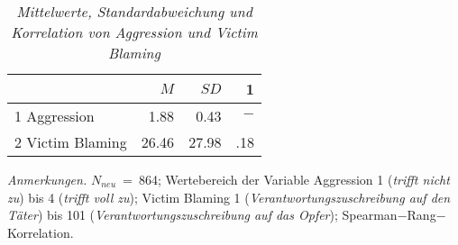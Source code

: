 \begin{table}[htb]
    \caption[Mittelwerte, Standardabweichung und Korrelation von Aggression und Victim Blaming]{\textit {Mittelwerte, Standardabweichung und Korrelation von Aggression und Victim Blaming}} 
    \label{H1_Spearman}
    \centering
    \begin{adjustbox}{width=6.5cm} %
    \small
    \begin{tabular}{lrrr}
      \hline
        & $M$   & $SD$ & 1 \\
      \hline
    1 Aggression      & 1.88  & 0.43   & $-$      \\
    2 Victim Blaming  & 26.46 & 27.98  & .18      \\
       \hline
    \end{tabular}
    \end{adjustbox}
    
    \begin{tablenotes}
        \item \textit{Anmerkungen.} \( N_{neu} \)~=~864; Wertebereich der Variable Aggression 1 (\textit{trifft nicht zu}) bis 4 (\textit{trifft voll zu}); Victim Blaming 1 (\textit{Verantwortungszuschreibung auf den Täter}) bis 101 (\textit{Verantwortungszuschreibung auf das
        Opfer}); Spearman$-$Rang$-$Korrelation.
      \end{tablenotes}
    \end{table}

